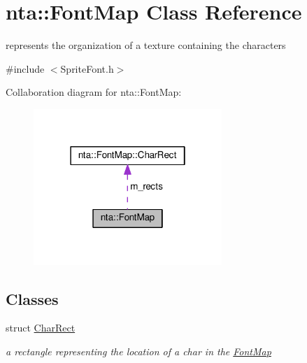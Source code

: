 \hypertarget{classnta_1_1FontMap}{}\section{nta\+:\+:Font\+Map Class Reference}
\label{classnta_1_1FontMap}


represents the organization of a texture containing the characters  




{\ttfamily \#include $<$Sprite\+Font.\+h$>$}



Collaboration diagram for nta\+:\+:Font\+Map\+:\nopagebreak
\begin{figure}[H]
\begin{center}
\leavevmode
\includegraphics[width=202pt]{d3/d2b/classnta_1_1FontMap__coll__graph}
\end{center}
\end{figure}
\subsection*{Classes}
\begin{DoxyCompactItemize}
\item 
struct \hyperlink{structnta_1_1FontMap_1_1CharRect}{Char\+Rect}
\begin{DoxyCompactList}\small\item\em a rectangle representing the location of a char in the \hyperlink{classnta_1_1FontMap}{Font\+Map} \end{DoxyCompactList}\end{DoxyCompactItemize}
